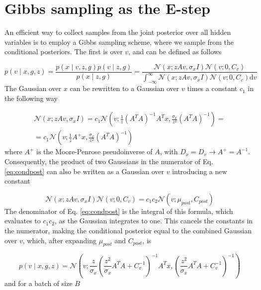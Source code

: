 \documentclass{paper}
\begin{document}
\section{Gibbs sampling as the E-step} \label{sec:estep}

An efficient way to collect samples from the joint posterior over all hidden variables is to employ a Gibbs sampling scheme, where we sample from the conditional posteriors. The first is over $v$, and can be defined as follows

\begin{equation} \label{eq:condpost}
p(v \mid x,g,z) = \frac{p(x \mid v,z,g) p(v \mid z,g)}{p(x \mid z,g)} = \frac{\mathcal{N}(x;zAv,\sigma_x I) \mathcal{N}(v;0,C_v)}{\int_{-\infty}^{\infty} \mathcal{N}(x;zAv,\sigma_x I) \mathcal{N}(v;0,C_v) \mathrm{d}v}
\end{equation}
%
The Gaussian over $x$ can be rewritten to a Gaussian over $v$ times a constant $c_1$ in the following way

\begin{equation} \label{eq:gauss_rewrite1}
\begin{split}
\mathcal{N}(x;zAv,\sigma_x I) = c_1 \mathcal{N}(v; \frac{1}{z} (A^T A)^{-1} A^T x, \frac{\sigma_x}{z^2} (A^T A)^{-1}) = \\
= c_1 \mathcal{N}(v; \frac{1}{z} A^{+} x, \frac{\sigma_x}{z^2} (A^T A)^{-1})
\end{split}
\end{equation}
%
where $A^{+}$ is the Moore-Penrose pseudoinverse of $A$, with $D_x = D_v \rightarrow A^{+} = A^{-1}$. Consequently, the product of two Gaussians in the numerator of Eq. \ref{eq:condpost} can also be written as a Gaussian over $v$ introducing a new constant

\begin{equation} \label{eq:gauss_rewrite2}
\mathcal{N}(x;zAv,\sigma_x I) \mathcal{N}(v;0,C_v) = c_1 c_2 \mathcal{N}(v; \mu_{post},C_{post})
\end{equation}
%
The denominator of Eq. \ref{eq:condpost} is the integral of this formula, which evaluates to $c_1c_2$, as the Gaussian integrates to one. This cancels the constants in the numerator, making the conditional posterior equal to the combined Gaussian over $v$, which, after expanding $\mu_{post}$ and $C_{post}$, is

\begin{equation}
p(v \mid x,g,z) = \mathcal{N}\left(v; \frac{z}{ \sigma_x} \left( \frac{z^2}{ \sigma_x} A^T A + C_v^{-1}\right)^{-1} A^T x, \left(\frac{z^2}{\sigma_x} A^T A + C_v^{-1}\right)^{-1}\right)
\end{equation}
%
and for a batch of size $B$
\end{document}
